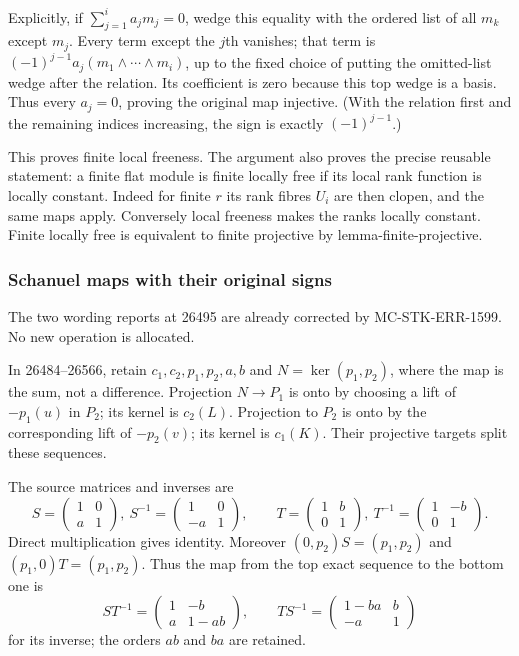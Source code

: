 Explicitly, if \(\sum_{j=1}^i a_jm_j=0\), wedge this equality with the ordered list of all \(m_k\) except \(m_j\). Every term except the \(j\)th vanishes; that term is \((-1)^{j-1}a_j(m_1\wedge\cdots\wedge m_i)\), up to the fixed choice of putting the omitted-list wedge after the relation. Its coefficient is zero because this top wedge is a basis. Thus every \(a_j=0\), proving the original map injective. (With the relation first and the remaining indices increasing, the sign is exactly \((-1)^{j-1}\).)

This proves finite local freeness. The argument also proves the precise reusable statement: a finite flat module is finite locally free if its local rank function is locally constant. Indeed for finite \(r\) its rank fibres \(U_i\) are then clopen, and the same maps apply. Conversely local freeness makes the ranks locally constant. Finite locally free is equivalent to finite projective by lemma-\AlgebraIdentifierBreak{}finite-\AlgebraIdentifierBreak{}projective.

\subsubsection{Schanuel maps with their original signs}\label{algebra-proof-022-schanuel-maps-with-their-original-signs}

The two wording reports at 26495 are already corrected by MC-\AlgebraIdentifierBreak{}STK-\AlgebraIdentifierBreak{}ERR-\AlgebraIdentifierBreak{}1599. No new operation is allocated.

In 26484--26566, retain \(c_1,c_2,p_1,p_2,a,b\) and \(N=\ker(p_1,p_2)\), where the map is the sum, not a difference. Projection \(N\to P_1\) is onto by choosing a lift of \(-p_1(u)\) in \(P_2\); its kernel is \(c_2(L)\). Projection to \(P_2\) is onto by the corresponding lift of \(-p_2(v)\); its kernel is \(c_1(K)\). Their projective targets split these sequences.

The source matrices and inverses are \[
S=\begin{pmatrix}1&0\\a&1\end{pmatrix},\
S^{-1}=\begin{pmatrix}1&0\\-a&1\end{pmatrix},\qquad
T=\begin{pmatrix}1&b\\0&1\end{pmatrix},\
T^{-1}=\begin{pmatrix}1&-b\\0&1\end{pmatrix}.
\] Direct multiplication gives identity. Moreover \((0,p_2)S=(p_1,p_2)\) and \((p_1,0)T=(p_1,p_2)\). Thus the map from the top exact sequence to the bottom one is \[
ST^{-1}=\begin{pmatrix}1&-b\\a&1-ab\end{pmatrix},
\qquad
TS^{-1}=\begin{pmatrix}1-ba&b\\-a&1\end{pmatrix}
\] for its inverse; the orders \(ab\) and \(ba\) are retained.

